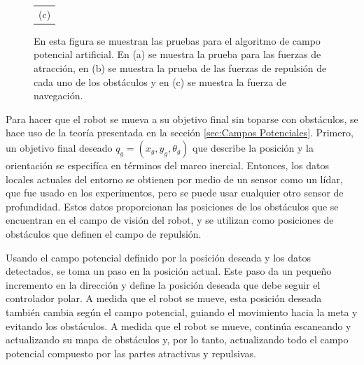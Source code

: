 \begin{figure}
\begin{tabular}{cc}
    \multicolumn{2}{c}{(c)}
  \end{tabular}
  \captionsetup{font=footnotesize}
    \caption{\label{f:APF}En esta figura se muestran las pruebas para el algoritmo de campo potencial 
    artificial. En (a) se muestra la prueba para las fuerzas de atracción, en (b) se muestra la
    prueba de las fuerzas de repulsión de cada uno de los obstáculos y en (c) se muestra la fuerza
    de navegación.}
\end{figure}
Para hacer que el robot se mueva a su objetivo final sin toparse con obstáculos, se 
hace uso de la teoría presentada en la sección \ref{sec:Campos Potenciales}. Primero, un 
objetivo final deseado $q_{g} =(x_{g}, y_{g}, \theta_{g})$ que describe la posición y la 
orientación se especifíca en términos del marco inercial. Entonces, los datos locales 
actuales del entorno se obtienen por medio de un sensor como un lídar, que fue usado en 
los experimentos, pero se puede usar cualquier otro sensor de profundidad. Estos datos 
proporcionan las posiciones de los obstáculos que se encuentran en el campo de visión del 
robot, y se utilizan como posiciones de obstáculos que definen el campo de repulsión. 

Usando el campo potencial definido por la posición deseada y los datos detectados, se toma un 
paso en la posición actual. Este paso da un pequeño incremento en la dirección y define la 
posición deseada que debe seguir el controlador polar. A medida que el robot se mueve, esta 
posición deseada también cambia según el campo potencial, guiando el movimiento hacia la meta 
y evitando los obstáculos. A medida que el robot se mueve, continúa escaneando y actualizando 
su mapa de obstáculos y, por lo tanto, actualizando todo el campo potencial compuesto por las 
partes atractivas y repulsivas.

